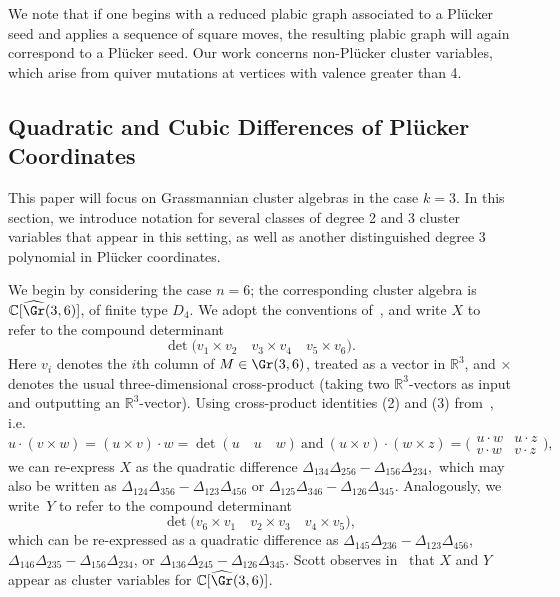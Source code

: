 We note that if one begins with a reduced plabic graph associated to a Pl\"ucker seed and applies a sequence of square moves, the resulting plabic graph will again correspond to a Pl\"ucker seed. Our work concerns non-Pl\"ucker cluster variables, which arise from quiver mutations at vertices with valence greater than 4.


\subsection{Quadratic and Cubic Differences of Pl\"ucker Coordinates}\label{subsection:differences}
This paper will focus on Grassmannian cluster algebras in the case $k=3$. In this section, we introduce notation for several classes of degree 2 and 3 cluster variables that appear in this setting, as well as another distinguished degree 3 polynomial in Pl{\"u}cker coordinates.

We begin by considering the case $n=6$; the corresponding cluster algebra is $\mathbb{C}[\widehat{\Gr}(3,6)]$, of finite type $D_4$. We adopt the conventions of~\cite{s06}, and write $X$ to refer to the compound determinant 
\[\det \bigg( v_1 \times v_2 \quad v_3 \times v_4 \quad v_5 \times v_6\bigg).\]
Here $v_i$ denotes the $i$th column of $M \in \Gr(3,6)$, treated as a vector in $\mathbb{R}^3$, and $\times$ denotes the usual three-dimensional cross-product (taking two $\mathbb{R}^3$-vectors as input and outputting an $\mathbb{R}^3$-vector).  Using cross-product identities (2) and (3) from~\cite{s06}, i.e. 
$$ u \cdot (v \times w) = (u \times v) \cdot w = \det ( u \quad u \quad w) \mathrm{~and~}
(u \times v) \cdot (w \times z) = \bigg( \begin{matrix} u\cdot w & u\cdot z \\ v\cdot w & v\cdot z\end{matrix}\bigg),$$
we can re-express $X$ as the quadratic difference
$\Delta_{134}\Delta_{256}-\Delta_{156}\Delta_{234},$
which may also be written as $\Delta_{124}\Delta_{356}-\Delta_{123}\Delta_{456}$ or $\Delta_{125}\Delta_{346}-\Delta_{126}\Delta_{345}.$
Analogously, we write~$Y$ to refer to the compound determinant
$$\det \bigg( v_6 \times v_1 \quad v_2 \times v_3 \quad v_4 \times v_5\bigg),$$ which can be re-expressed as a quadratic difference as
$\Delta_{145}\Delta_{236}-\Delta_{123}\Delta_{456}$,
$\Delta_{146}\Delta_{235}-\Delta_{156}\Delta_{234}$, or $\Delta_{136}\Delta_{245}-\Delta_{126}\Delta_{345}.$
Scott observes in~\cite{s06} that $X$ and $Y$ appear as cluster variables for $\mathbb{C}[\widehat{\Gr}(3,6)]$.

